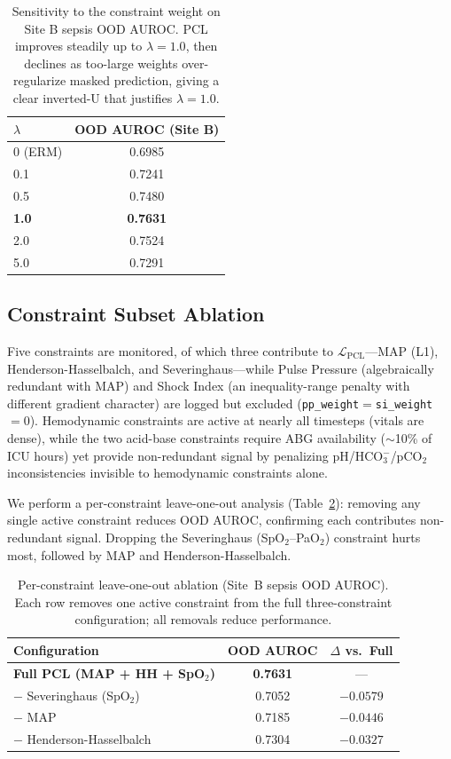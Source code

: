 \documentclass{article}
\begin{document}
\begin{table}[htbp]
\caption{Sensitivity to the constraint weight on Site B sepsis OOD AUROC. PCL improves steadily up to $\lambda{=}1.0$, then declines as too-large weights over-regularize masked prediction, giving a clear inverted-U that justifies $\lambda{=}1.0$.}
\label{tab:lambda}
\centering
\small
\begin{tabular}{@{}lc@{}}
\toprule
$\lambda$ & OOD AUROC (Site B) \\
\midrule
0 (ERM) & 0.6985 \\
0.1 & 0.7241 \\
0.5 & 0.7480 \\
\textbf{1.0} & \textbf{0.7631} \\
2.0 & 0.7524 \\
5.0 & 0.7291 \\
\bottomrule
\end{tabular}
\end{table}

\subsection{Constraint Subset Ablation}

Five constraints are monitored, of which three contribute to $\mathcal{L}_{\text{PCL}}$---MAP (L1), Henderson-Hasselbalch, and Severinghaus---while Pulse Pressure (algebraically redundant with MAP) and Shock Index (an inequality-range penalty with different gradient character) are logged but excluded (\texttt{pp\_weight}$=$\texttt{si\_weight}$=0$).
Hemodynamic constraints are active at nearly all timesteps (vitals are dense), while the two acid-base constraints require ABG availability ($\sim$10\% of ICU hours) yet provide non-redundant signal by penalizing pH/HCO$_3^-$/pCO$_2$ inconsistencies invisible to hemodynamic constraints alone.

We perform a per-constraint leave-one-out analysis (Table~\ref{tab:subset}): removing any single active constraint reduces OOD AUROC, confirming each contributes non-redundant signal. Dropping the Severinghaus (SpO$_2$--PaO$_2$) constraint hurts most, followed by MAP and Henderson-Hasselbalch.

\begin{table}[htbp]
\caption{Per-constraint leave-one-out ablation (Site~B sepsis OOD AUROC). Each row removes one active constraint from the full three-constraint configuration; all removals reduce performance.}
\label{tab:subset}
\centering
\small
\begin{tabular}{@{}lcc@{}}
\toprule
Configuration & OOD AUROC & $\Delta$ vs.\ Full \\
\midrule
\textbf{Full PCL (MAP + HH + SpO$_2$)} & \textbf{0.7631} & --- \\
$-$ Severinghaus (SpO$_2$) & 0.7052 & $-0.0579$ \\
$-$ MAP & 0.7185 & $-0.0446$ \\
$-$ Henderson-Hasselbalch & 0.7304 & $-0.0327$ \\
\bottomrule
\end{tabular}
\end{table}
\end{document}
